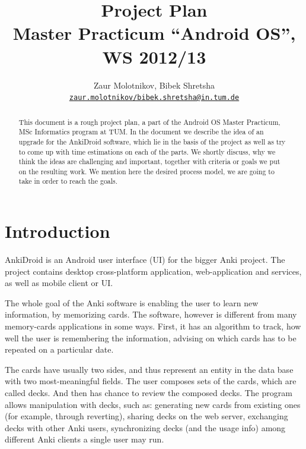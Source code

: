 \documentclass[a4paper,11pt,twoside]{article}
\begin{document}

\title{Project Plan\\
{\normalsize Master Practicum ``Android OS'', WS 2012/13}}


\author{%
  Zaur Molotnikov, Bibek Shretsha\\%
  \texttt{\url{zaur.molotnikov/bibek.shretsha@in.tum.de}}%
}



\maketitle



\pagebreak


\begin{abstract}
This document is a rough project plan, a part of the Android OS Master Practicum, MSc Informatics program at TUM.
In the document we describe the idea of an upgrade for the AnkiDroid software, 
which lie in the basis of the project as well as try to come up with time estimations on each of the parts.
We shortly discuss, why we think the ideas are challenging and important, together with criteria or goals we put on the 
resulting work. We mention here the desired process model, we are going to take in order to reach the goals.
\end{abstract}

\pagebreak

\tableofcontents

\pagebreak

\section{Introduction}
\label{sec:intro}
AnkiDroid is an Android user interface (UI) for the bigger Anki project. The project contains desktop cross-platform 
application, web-application and services, as well as mobile client or UI. 

The whole goal of the Anki software is enabling the user to learn new information, by memorizing cards. The software,
however is different from many memory-cards applications in some ways. First, it has an algorithm to track, how well
the user is remembering the information, advising on which cards has to be repeated on a particular date.


The cards have usually two sides, and thus represent an entity in the data base with two most-meaningful fields. The
user composes sets of the cards, which are called decks. And then has chance to review the composed decks. The program
allows manipulation with decks, such as: generating new cards from existing ones (for example, through reverting),
sharing decks on the web server, exchanging decks with other Anki users, synchronizing decks (and the usage info) among 
different Anki clients a single user may run.
\end{document}
